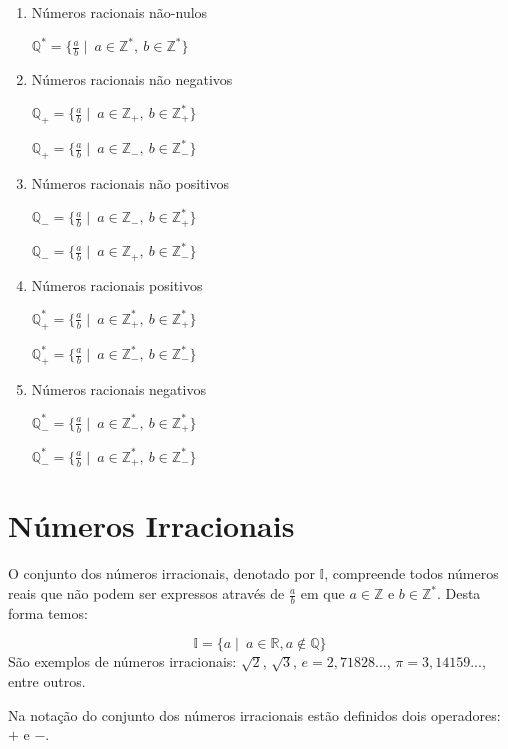 \documentclass[]{book}
\begin{document}
\begin{enumerate}
\def\labelenumi{\arabic{enumi}.}
\item
  Números racionais não-nulos

  \(\mathbb{Q}^{*} = \{ \frac{a}{b} \mid \ a \in \mathbb{Z}^{*},\ b \in \mathbb{Z}^{*} \}\)
\item
  Números racionais não negativos

  \(\mathbb{Q}_{+} = \{ \frac{a}{b} \mid \ a \in \mathbb{Z}_{+},\ b \in \mathbb{Z}_{+}^{*} \}\)

  \(\mathbb{Q}_{+} = \{ \frac{a}{b} \mid \ a \in \mathbb{Z}_{-},\ b \in \mathbb{Z}_{-}^{*} \}\)
\item
  Números racionais não positivos

  \(\mathbb{Q}_{-} = \{ \frac{a}{b} \mid \ a \in \mathbb{Z}_{-},\ b \in \mathbb{Z}_{+}^{*} \}\)

  \(\mathbb{Q}_{-} = \{ \frac{a}{b} \mid \ a \in \mathbb{Z}_{+},\ b \in \mathbb{Z}_{-}^{*} \}\)
\item
  Números racionais positivos

  \(\mathbb{Q}_{+}^{*} = \{ \frac{a}{b} \mid \ a \in \mathbb{Z}_{+}^{*},\ b \in \mathbb{Z}_{+}^{*} \}\)

  \(\mathbb{Q}_{+}^{*} = \{ \frac{a}{b} \mid \ a \in \mathbb{Z}_{-}^{*},\ b \in \mathbb{Z}_{-}^{*} \}\)
\item
  Números racionais negativos

  \(\mathbb{Q}_{-}^{*} = \{ \frac{a}{b} \mid \ a \in \mathbb{Z}_{-}^{*},\ b \in \mathbb{Z}_{+}^{*} \}\)

  \(\mathbb{Q}_{-}^{*} = \{ \frac{a}{b} \mid \ a \in \mathbb{Z}_{+}^{*},\ b \in \mathbb{Z}_{-}^{*} \}\)
\end{enumerate}

\section{Números Irracionais}\label{numeros-irracionais}

O conjunto dos números irracionais, denotado por \(\mathbb{I}\),
compreende todos números reais que não podem ser expressos através de
\(\frac{a}{b}\) em que \(a \in \mathbb{Z}\) e \(b \in \mathbb{Z}^{*}\).
Desta forma temos:

\[\mathbb{I} = \{a \mid \ a \in \mathbb{R}, a \notin \mathbb{Q} \}\] São
exemplos de números irracionais: \(\sqrt{2}\), \(\sqrt{3}\),
\(e = 2,71828...\), \(\pi = 3,14159...\), entre outros.

Na notação do conjunto dos números irracionais estão definidos dois
operadores: \(+\) e \(-\).
\end{document}
